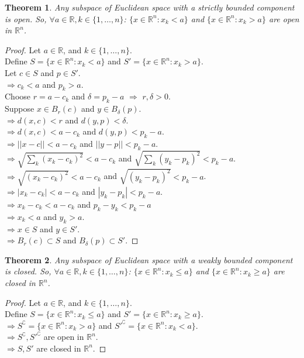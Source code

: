 \documentclass{article}
\newtheorem{theorem}{Theorem}[section]
\begin{document}
			\begin{theorem}
				Any subspace of Euclidean space with a strictly bounded component is open. So, $\forall a \in \mathbb{R}, k \in \{ 1, \ldots, n \}$: 
				$\{ x \in \mathbb{R}^n: x_k < a \}$ and $\{ x \in \mathbb{R}^n: x_k > a \}$ are open in $\mathbb{R}^n$.
			\end{theorem}
			\begin{proof} 
				Let $a \in \mathbb{R}$, and $k \in \{ 1, \ldots, n \}$. \\
				Define $S = \{ x \in \mathbb{R}^n: x_k < a \}$ and $S' = \{ x \in \mathbb{R}^n: x_k > a \}$. \\
				Let $c \in S$ and $p \in S'$. \\
				$\Rightarrow c_k < a$ and $p_k > a$. \\
				Choose $r = a - c_k$ and $\delta = p_k - a$ $\Rightarrow$ $r, \delta > 0$. \\
				Suppose $x \in B_{r}(c)$ and $y \in B_{\delta}(p)$. \\
				$\Rightarrow d(x, c) < r$ and $d(y, p) < \delta$. \\
				$\Rightarrow d(x, c) < a - c_k$ and $d(y, p) < p_k - a$. \\
				$\Rightarrow || x - c || < a - c_k$ and $|| y - p || < p_k - a$. \\
				$\Rightarrow \sqrt{\sum_{k} (x_k - c_k)^2} <  a - c_k$ and $\sqrt{\sum_{k} (y_k - p_k)^2} < p_k - a$. \\
				$\Rightarrow \sqrt{(x_k - c_k)^2} <  a - c_k$ and $\sqrt{(y_k - p_k)^2} < p_k - a$. \\
				$\Rightarrow | x_k - c_k | <  a - c_k$ and $| y_k - p_k | <  p_k - a$. \\
				$\Rightarrow x_k - c_k <  a - c_k$ and $p_k - y_k < p_k - a$ \\
				$\Rightarrow x_k <  a$ and $y_k >  a$. \\
				$\Rightarrow x \in S$ and $y \in S'$. \\
				$\Rightarrow B_{r}(c) \subset S$ and $B_{\delta}(p) \subset S'$.
			\end{proof}

			\begin{theorem}
				Any subspace of Euclidean space with a weakly bounded component is closed. So, $\forall a \in \mathbb{R}, k \in \{ 1, \ldots, n \}$: 
				$\{ x \in \mathbb{R}^n: x_k \leq a \}$ and $\{ x \in \mathbb{R}^n: x_k \geq a \}$ are closed in $\mathbb{R}^n$.
			\end{theorem}
			\begin{proof} 
				Let $a \in \mathbb{R}$, and $k \in \{ 1, \ldots, n \}$. \\
				Define $S = \{ x \in \mathbb{R}^n: x_k \leq a \}$ and $S' = \{ x \in \mathbb{R}^n: x_k \geq a \}$. \\
				$\Rightarrow S^\complement = \{ x \in \mathbb{R}^n: x_k > a \}$ and $S'^\complement = \{ x \in \mathbb{R}^n: x_k < a \}$. \\
				$\Rightarrow S^\complement, S'^\complement$ are open in $\mathbb{R}^n$. \\
				$\Rightarrow S, S'$ are closed in  $\mathbb{R}^n$.
			\end{proof}
\end{document}

